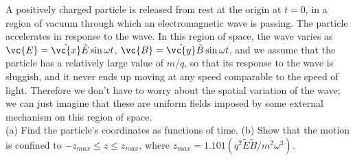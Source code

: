         A positively charged particle is released from rest at the origin at $t=0$,
        in a region of vacuum through which 
        an electromagnetic wave is passing. The particle accelerates in response to
        the wave.
        In this region of space, the wave varies as $\vc{E}=\hat{\vc{x}}\tilde{E}\sin\omega t$,
        $\vc{B}=\hat{\vc{y}}\tilde{B}\sin\omega t$, and we assume that the particle has
        a relatively large value of $m/q$, so that its response to the wave is sluggish,
        and it never ends up moving at any speed comparable to the speed of light. Therefore
        we don't have to worry about the spatial variation of the wave; we can just imagine
        that these are uniform fields imposed by some external mechanism on this region of
        space.\\
        (a) Find the particle's coordinates as functions of time.\answercheck\hwendpart
        (b) Show that the motion is confined to $-z_{max}\leq z \leq z_{max}$,
        where $z_{max} = 1.101\left(q^2\tilde{E}\tilde{B}/m^2\omega^3\right)$.
